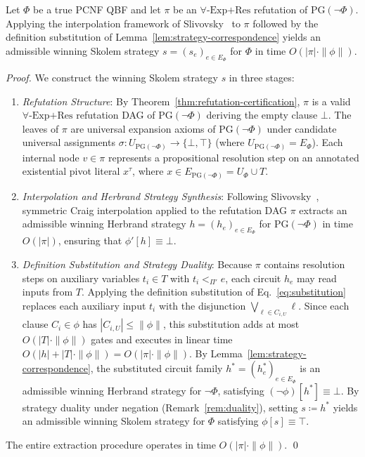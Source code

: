 \documentclass[runningheads]{llncs}
\newcommand{\Bool}{\{\bot,\top\}}
\newcommand{\ExpRes}{\forall\text{-}\mathrm{Exp}\text{+}\mathrm{Res}}
\newcommand{\PG}{\mathrm{PG}}
\begin{document}
\begin{theorem}
    \label{thm:skolem-extraction}
    Let $\Phi$ be a true PCNF QBF and let $\pi$ be an $\ExpRes$ refutation of $\PG(\neg\Phi)$.
    Applying the interpolation framework of Slivovsky~\cite{slivovsky2024} to $\pi$ followed by the definition substitution of Lemma~\ref{lem:strategy-correspondence} yields an admissible winning Skolem strategy $s = (s_e)_{e \in E_\Phi}$ for $\Phi$ in time $O(|\pi| \cdot \|\phi\|)$.
\end{theorem}
\begin{proof}
    We construct the winning Skolem strategy $s$ in three stages:
    \begin{enumerate}
        \item \emph{Refutation Structure}:
              By Theorem~\ref{thm:refutation-certification}, $\pi$ is a valid $\ExpRes$ refutation DAG of $\PG(\neg\Phi)$ deriving the empty clause $\bot$.
              The leaves of $\pi$ are universal expansion axioms of $\PG(\neg\Phi)$ under candidate universal assignments $\sigma : U_{\PG(\neg\Phi)} \to \Bool$ (where $U_{\PG(\neg\Phi)} = E_\Phi$).
              Each internal node $v \in \pi$ represents a propositional resolution step on an annotated existential pivot literal $x^\tau$, where $x \in E_{\PG(\neg\Phi)} = U_\Phi \cup T$.
        \item \emph{Interpolation and Herbrand Strategy Synthesis}:
              Following Slivovsky~\cite{slivovsky2024}, symmetric Craig interpolation applied to the refutation DAG $\pi$ extracts an admissible winning Herbrand strategy $h = (h_e)_{e \in E_\Phi}$ for $\PG(\neg\Phi)$ in time $O(|\pi|)$, ensuring that $\phi'[h] \equiv \bot$.
        \item \emph{Definition Substitution and Strategy Duality}:
              Because $\pi$ contains resolution steps on auxiliary variables $t_i \in T$ with $t_i <_{\Pi'} e$, each circuit $h_e$ may read inputs from $T$.
              Applying the definition substitution of Eq.~\eqref{eq:substitution} replaces each auxiliary input $t_i$ with the disjunction $\bigvee_{\ell \in C_{i,U}} \ell$.
              Since each clause $C_i \in \phi$ has $|C_{i,U}| \le \|\phi\|$, this substitution adds at most $O(|T| \cdot \|\phi\|)$ gates and executes in linear time $O(|h| + |T| \cdot \|\phi\|) = O(|\pi| \cdot \|\phi\|)$.
              By Lemma~\ref{lem:strategy-correspondence}, the substituted circuit family $h^* = (h_e^*)_{e \in E_\Phi}$ is an admissible winning Herbrand strategy for $\neg\Phi$, satisfying $(\neg\phi)[h^*] \equiv \bot$.
              By strategy duality under negation (Remark~\ref{rem:duality}), setting $s \coloneqq h^*$ yields an admissible winning Skolem strategy for $\Phi$ satisfying $\phi[s] \equiv \top$.
    \end{enumerate}
    The entire extraction procedure operates in time $O(|\pi| \cdot \|\phi\|)$.
    \qed
\end{proof}
\end{document}

